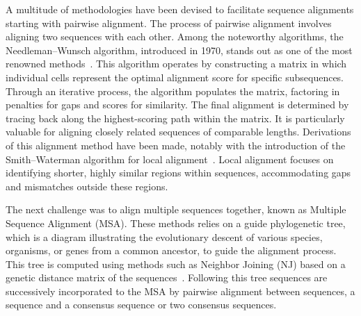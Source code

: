 A multitude of methodologies have been devised to facilitate sequence alignments starting with pairwise alignment. The process of pairwise alignment involves aligning two sequences with each other. Among the noteworthy algorithms, the Needleman–Wunsch algorithm, introduced in 1970, stands out as one of the most renowned methods~\citep{needleman_general_1970}. This algorithm operates by constructing a matrix in which individual cells represent the optimal alignment score for specific subsequences. Through an iterative process, the algorithm populates the matrix, factoring in penalties for gaps and scores for similarity. The final alignment is determined by tracing back along the highest-scoring path within the matrix. It is particularly valuable for aligning closely related sequences of comparable lengths. Derivations of this alignment method have been made, notably with the introduction of the Smith–Waterman algorithm for local alignment~\citep{smith_identification_1981}. Local alignment focuses on identifying shorter, highly similar regions within sequences, accommodating gaps and mismatches outside these regions.

The next challenge was to align multiple sequences together, known as Multiple Sequence Alignment (MSA). These methods relies on a guide phylogenetic tree, which is a diagram illustrating the evolutionary descent of various species, organisms, or genes from a common ancestor, to guide the alignment process. This tree is computed using methods such as Neighbor Joining (NJ) based on a genetic distance matrix of the sequences~\citep{saitou_neighbor-joining_1987}. Following this tree sequences are successively incorporated to the MSA by pairwise alignment between sequences, a sequence and a consensus sequence or two consensus sequences.

